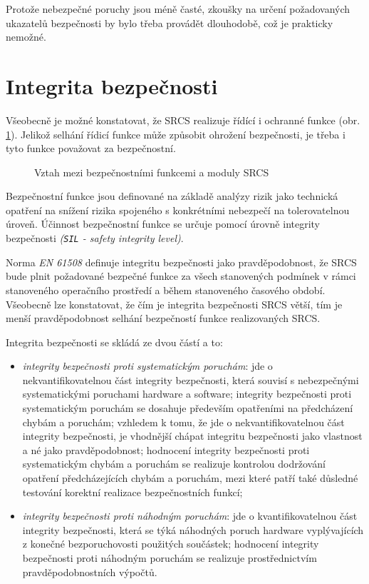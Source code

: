 {      Protože nebezpečné poruchy jsou méně časté, zkoušky na určení požadovaných ukazatelů
      bezpečnosti by bylo třeba provádět dlouhodobě, což je prakticky nemožné. 
    
  \section{Integrita bezpečnosti}
    Všeobecně je možné konstatovat, že SRCS realizuje řídící i ochranné funkce (obr.
    \ref{DZT:fig_DZT_SRCS_fce}). Jelikož selhání řídicí funkce může způsobit ohrožení bezpečnosti,
    je třeba i tyto funkce považovat za bezpečnostní.
    \begin{figure}[ht!]
      \centering
      \caption{Vztah mezi bezpečnostními funkcemi a moduly SRCS}
      \label{DZT:fig_DZT_SRCS_fce}
    \end{figure}    
    Bezpečnostní funkce jsou definované na základě analýzy rizik jako technická opatření na snížení
    rizika spojeného s konkrétními nebezpečí na tolerovatelnou úroveň. Účinnost bezpečnostní funkce
    se určuje pomocí úrovně integrity bezpečnosti \emph{(\texttt{SIL} - safety integrity level)}. 
    
    Norma \emph{EN 61508} definuje integritu bezpečnosti jako pravděpodobnost, že SRCS bude plnit 
    požadované bezpečné funkce za všech stanovených podmínek v rámci stanoveného operačního 
    prostředí a během stanoveného časového období. Všeobecně lze konstatovat, že čím je integrita
    bezpečnosti SRCS větší, tím je menší pravděpodobnost selhání bezpečností funkce realizovaných
    SRCS.  
    
    Integrita bezpečnosti se skládá ze dvou částí a to:
    \begin{itemize}
      \item \emph{integrity bezpečnosti proti systematickým poruchám}: jde o nekvantifikovatelnou
            část integrity bezpečnosti, která souvisí s nebezpečnými systematickými poruchami 
            hardware a software; integrity bezpečnosti proti systematickým poruchám se dosahuje
            především opatřeními na předcházení chybám a poruchám; vzhledem k tomu, že jde o 
            nekvantifikovatelnou část integrity bezpečnosti, je vhodnější chápat integritu 
            bezpečnosti jako vlastnost a né jako pravděpodobnost; hodnocení integrity bezpečnosti
            proti systematickým chybám a poruchám se realizuje kontrolou dodržování opatření
            předcházejících chybám a poruchám, mezi které patří také důsledné testování korektní
            realizace bezpečnostních funkcí; 
      \item \emph{integrity bezpečnosti proti náhodným poruchám}: jde o kvantifikovatelnou část
            integrity bezpečnosti, která se týká náhodných poruch hardware vyplývajících z konečné
            bezporuchovosti použitých součástek; hodnocení integrity bezpečnosti proti náhodným
            poruchám se realizuje prostřednictvím pravděpodobnostních výpočtů.
    \end{itemize}
    
}
